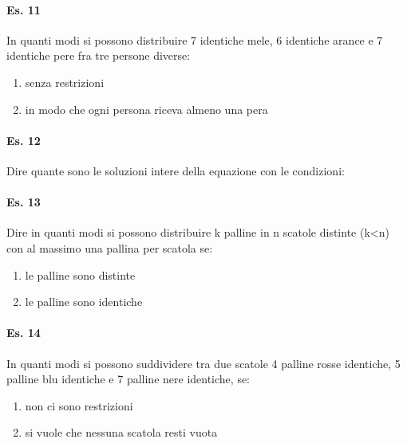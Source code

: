 \paragraph{Es. 11} In quanti modi si possono distribuire
7 identiche mele, 6 identiche arance e 7 identiche pere
fra tre persone diverse:
\begin{enumerate}
    \item senza restrizioni
    \item in modo che ogni persona riceva almeno una pera
\end{enumerate}

\paragraph{Es. 12} Dire quante sono le soluzioni intere della equazione
con le condizioni:

\paragraph{Es. 13} Dire in quanti modi si possono distribuire k palline in n scatole distinte (k<n) con al massimo
una pallina per scatola se:
\begin{enumerate}
    \item le palline sono distinte
    \item le palline sono identiche
\end{enumerate}

\paragraph{Es. 14}
In quanti modi si possono suddividere tra due scatole
4 palline rosse identiche, 5 palline blu identiche e 7 palline nere identiche, se:
\begin{enumerate}
    \item non ci sono restrizioni
    \item si vuole che nessuna scatola resti vuota
\end{enumerate}


\newpage